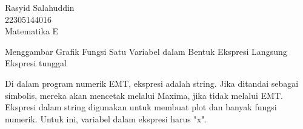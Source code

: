 \documentclass[a4paper,10pt]{article}
\begin{document}
\begin{eulernotebook}
\begin{eulercomment}
Rasyid Salahuddin\\
22305144016\\
Matematika E



\begin{eulercomment}
\begin{eulercomment}
Menggambar Grafik Fungsi Satu Variabel dalam Bentuk Ekspresi Langsung
Ekspresi tunggal

Di dalam program numerik EMT, ekspresi adalah string. Jika ditandai
sebagai simbolis, mereka akan mencetak melalui Maxima, jika tidak
melalui EMT. Ekspresi dalam string digunakan untuk membuat plot dan
banyak fungsi numerik. Untuk ini, variabel dalam ekspresi harus "x".


\end{eulercomment}
\end{eulercomment}
\end{eulercomment}
\end{eulernotebook}
\end{document}
